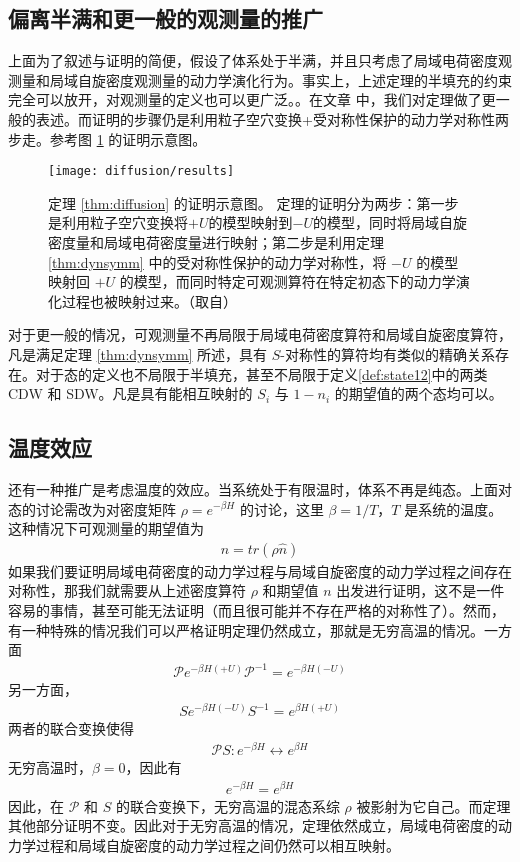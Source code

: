 \subsection{偏离半满和更一般的观测量的推广}
上面为了叙述与证明的简便，假设了体系处于半满，并且只考虑了局域电荷密度观测量和局域自旋密度观测量的动力学演化行为。事实上，上述定理的半填充的约束完全可以放开，对观测量的定义也可以更广泛。。在文章 中，我们对定理做了更一般的表述。而证明的步骤仍是利用粒子空穴变换+受对称性保护的动力学对称性两步走。参考图 \ref{fig:diffusion:results} 的证明示意图。
\begin{figure}[!htb]
\centering
\texttt{[image: diffusion/results]}
\caption{定理 \ref{thm:diffusion} 的证明示意图。 定理的证明分为两步：第一步是利用粒子空穴变换将$+U$的模型映射到$-U$的模型，同时将局域自旋密度量和局域电荷密度量进行映射；第二步是利用定理 \ref{thm:dynsymm} 中的受对称性保护的动力学对称性，将 $-U$ 的模型映射回 $+U$ 的模型，而同时特定可观测算符在特定初态下的动力学演化过程也被映射过来。（取自）}
\label{fig:diffusion:results}
\end{figure}

对于更一般的情况，可观测量不再局限于局域电荷密度算符和局域自旋密度算符，凡是满足定理 \ref{thm:dynsymm} 所述，具有 $S$-对称性的算符均有类似的精确关系存在。对于态的定义也不局限于半填充，甚至不局限于定义\ref{def:state12}中的两类 CDW 和 SDW。凡是具有能相互映射的 $S_i$ 与 $1-n_i$ 的期望值的两个态均可以。


\subsection{温度效应}
还有一种推广是考虑温度的效应。当系统处于有限温时，体系不再是纯态。上面对态的讨论需改为对密度矩阵 $\rho=e^{-\beta H}$ 的讨论，这里 $\beta=1/T$，$T$ 是系统的温度。这种情况下可观测量的期望值为 
\begin{align}
n = tr(\rho\hat{n})
\end{align}
如果我们要证明局域电荷密度的动力学过程与局域自旋密度的动力学过程之间存在对称性，那我们就需要从上述密度算符 $\rho$ 和期望值 $n$ 出发进行证明，这不是一件容易的事情，甚至可能无法证明（而且很可能并不存在严格的对称性了）。然而，有一种特殊的情况我们可以严格证明定理仍然成立，那就是无穷高温的情况。一方面
\begin{align}
\mathcal{P}e^{-\beta H(+U)}\mathcal{P}^{-1} = e^{-\beta H(-U)}
\end{align}
另一方面，
\begin{align}
Se^{-\beta H(-U)}S^{-1} = e^{\beta H(+U)}
\end{align}
两者的联合变换使得
\begin{align}
\mathcal{P}S: e^{-\beta H} \leftrightarrow e^{\beta H}
\end{align}
无穷高温时，$\beta=0$，因此有
\begin{align}
e^{-\beta H} = e^{\beta H}
\end{align}
因此，在 $\mathcal{P}$ 和 $S$ 的联合变换下，无穷高温的混态系综 $\rho$ 被影射为它自己。而定理其他部分证明不变。因此对于无穷高温的情况，定理依然成立，局域电荷密度的动力学过程和局域自旋密度的动力学过程之间仍然可以相互映射。



